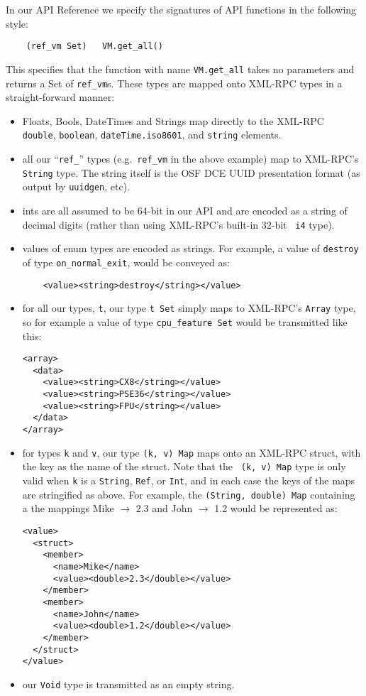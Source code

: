 In our API Reference we specify the signatures of API functions in the following
style:
\begin{verbatim}
    (ref_vm Set)   VM.get_all()
\end{verbatim}
This specifies that the function with name {\tt VM.get\_all} takes
no parameters and returns a Set of {\tt ref\_vm}s.
These types are mapped onto XML-RPC types in a straight-forward manner:
\begin{itemize}
  \item Floats, Bools, DateTimes and Strings map directly to the XML-RPC {\tt
  double}, {\tt boolean}, {\tt dateTime.iso8601}, and {\tt string} elements.

  \item all our ``{\tt ref\_}'' types (e.g.\ {\tt ref\_vm} in the above
  example) map to XML-RPC's {\tt String} type.  The string itself is the OSF
  DCE UUID presentation format (as output by {\tt uuidgen}, etc).

  \item ints are all assumed to be 64-bit in our API and are encoded as a
  string of decimal digits (rather than using XML-RPC's built-in 32-bit {\tt
  i4} type).

  \item values of enum types are encoded as strings. For example, a value of
  {\tt destroy} of type {\tt on\_normal\_exit}, would be conveyed as:
  \begin{verbatim}
    <value><string>destroy</string></value>
  \end{verbatim}

  \item for all our types, {\tt t}, our type {\tt t Set} simply maps to
  XML-RPC's {\tt Array} type, so for example a value of type {\tt cpu\_feature
  Set} would be transmitted like this:

  \begin{verbatim}
<array>
  <data>
    <value><string>CX8</string></value>
    <value><string>PSE36</string></value>
    <value><string>FPU</string></value>
  </data>
</array> 
  \end{verbatim}

  \item for types {\tt k} and {\tt v}, our type {\tt (k, v) Map} maps onto an
  XML-RPC struct, with the key as the name of the struct.  Note that the {\tt
  (k, v) Map} type is only valid when {\tt k} is a {\tt String}, {\tt Ref}, or
  {\tt Int}, and in each case the keys of the maps are stringified as
  above. For example, the {\tt (String, double) Map} containing a the mappings
  Mike $\rightarrow$ 2.3 and John $\rightarrow$ 1.2 would be represented as:

  \begin{verbatim}
<value>
  <struct>
    <member>
      <name>Mike</name>
      <value><double>2.3</double></value>
    </member>
    <member>
      <name>John</name>
      <value><double>1.2</double></value>
    </member>
  </struct>
</value>
  \end{verbatim}

  \item our {\tt Void} type is transmitted as an empty string.

\end{itemize}


